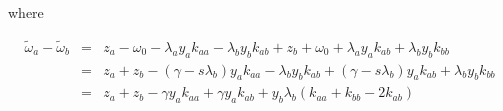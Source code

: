 where

\begin{eqnarray}
 \tilde\omega_a - \tilde\omega_b & = & z_a - \omega_0 - \lambda_a y_a k_{aa} - \lambda_b y_b k_{ab} + z_b + \omega_0 + \lambda_a y_a k_{ab} + \lambda_b y_b k_{bb} \nonumber \\ 
 & = & z_a + z_b - \left(\gamma - s\lambda_b\right)y_a k_{aa} - \lambda_b y_b k_{ab} + \left(\gamma - s\lambda_b\right)y_ak_{ab} + \lambda_b y_b k_{bb} \nonumber \\
 & = & z_a + z_b - \gamma y_a k_{aa} + \gamma y_a k_{ab} + y_b\lambda_b\left(k_{aa} + k_{bb} - 2k_{ab}\right)
\end{eqnarray}


